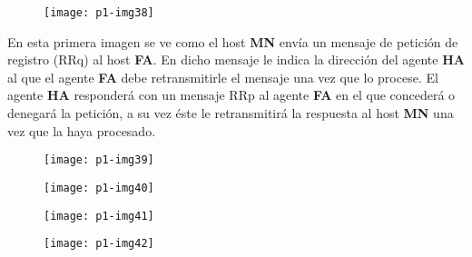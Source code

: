 \documentclass[10pt]{article}
\begin{document}
\begin{figure}[H]
	\begin{center}
 		\texttt{[image: p1-img38]}
	\end{center} 
\end{figure}

En esta primera imagen se ve como el host \textbf{MN} envía un mensaje de petición de registro (RRq) al host \textbf{FA}. En dicho mensaje le indica la dirección del agente \textbf{HA} al que el agente \textbf{FA} debe retransmitirle el mensaje una vez que lo procese. El agente \textbf{HA} responderá con un mensaje RRp al agente \textbf{FA} en el que concederá o denegará la petición, a su vez éste le retransmitirá la respuesta al host \textbf{MN} una vez que la haya procesado.\\

\begin{figure}[H]
	\begin{center}
 		\texttt{[image: p1-img39]}
	\end{center} 
\end{figure}

\begin{figure}[H]
	\begin{center}
 		\texttt{[image: p1-img40]}
	\end{center} 
\end{figure}

\begin{figure}[H]
	\begin{center}
 		\texttt{[image: p1-img41]}
	\end{center} 
\end{figure}

\begin{figure}[H]
	\begin{center}
 		\texttt{[image: p1-img42]}
	\end{center} 
\end{figure}
\end{document}
